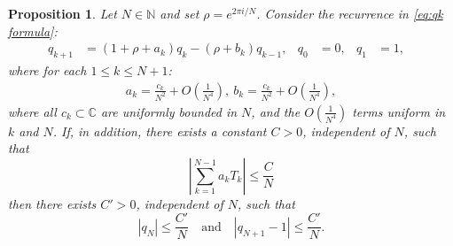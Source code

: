 \documentclass{amsart}
\newtheorem{prop}{Proposition}
\theoremstyle{remark}
\theoremstyle{definition}
\newcommand{\lp}{\left(}
\newcommand{\rp}{\right)}
\begin{document}
\begin{prop}\label{pro:summationconstant}
	Let $N\in\mathbb{N}$ and set $\rho = e^{2\pi i/N}$.  
Consider the recurrence in \eqref{eq:qk formula}:
	\begin{align*}
		q_{k+1} &= (1+\rho+a_k) q_{k}-(\rho+b_k) q_{k-1}, & q_0 &=0, & q_1&=1, &
	\end{align*}
where for each $1\leq k\leq N+1$: 
\begin{align*}
{a}_k = \frac{c_k}{N^2}+O\lp\frac{1}{N^4}\rp,\ {b}_k = \frac{c_k}{N^2}+O\lp\frac{1}{N^4}\rp,    
\end{align*}
where all $c_k\subset\mathbb{C}$ are uniformly bounded in $N$, and the $O(\tfrac{1}{N^4})$ terms uniform in $k$ and $N$.  
If, in addition, there exists a constant $C>0$, independent of $N$, such that
\begin{equation}\label{eq: ak/N^2 sum requirement}
    \left|\sum_{k=1}^{N-1} a_kT_k \right| \leq \frac{C}{N}
\end{equation}
then there exists $C'>0$, independent of $N$, such that
\begin{equation*}
		|q_N| \leq \frac{C'}{N} \quad\text{and}\quad |q_{N+1}-1|\leq \frac{C'}{N}.
	\end{equation*}
\end{prop}
\end{document}
